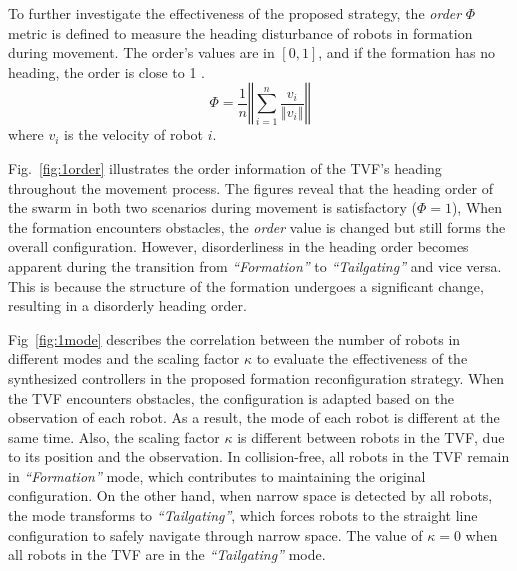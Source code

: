 To further investigate the effectiveness of the proposed strategy, the \textit{order} $\Phi$ metric is defined to measure the heading disturbance of robots in formation during movement. The order's values are in $\left[0,1\right]$, and if the formation has no heading, the order is close to 1 \cite{Vicsek1995}.
\begin{equation}
    \Phi=\dfrac{1}{n}\left\Vert\sum_{i=1}^n{\dfrac{v_i}{\left\Vert v_i\right\Vert}}\right\Vert
\end{equation}
where $v_i$ is the velocity of robot $i$.

Fig.~\ref{fig:1order} illustrates the order information of the TVF's heading throughout the movement process. The figures reveal that the heading order of the swarm in both two scenarios during movement is satisfactory ($\Phi = 1$), When the formation encounters obstacles, the \textit{order} value is changed but still forms the overall configuration. However, disorderliness in the heading order becomes apparent during the transition from \textit{``Formation''} to \textit{``Tailgating''} and vice versa. This is because the structure of the formation undergoes a significant change, resulting in a disorderly heading order.

Fig~\ref{fig:1mode} describes the correlation between the number of robots in different modes and the scaling factor $\kappa$ to evaluate the effectiveness of the synthesized controllers in the proposed formation reconfiguration strategy. When the TVF encounters obstacles, the configuration is adapted based on the observation of each robot. As a result, the mode of each robot is different at the same time. Also, the scaling factor $\kappa$ is different between robots in the TVF, due to its position and the observation. In collision-free, all robots in the TVF remain in \textit{``Formation''} mode, which contributes to maintaining the original configuration. On the other hand, when narrow space is detected by all robots, the mode transforms to \textit{``Tailgating''}, which forces robots to the straight line configuration to safely navigate through narrow space. The value of $\kappa=0$ when all robots in the TVF are in the \textit{``Tailgating''} mode.


